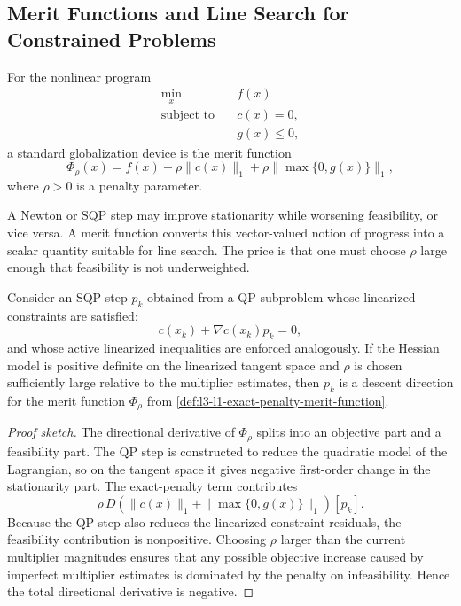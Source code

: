 \subsection{Merit Functions and Line Search for Constrained Problems}
\label{sec:l3-merit-functions-and-line-search-for-constrained-problems}

\begin{definition}\label{def:l3-l1-exact-penalty-merit-function}
	For the nonlinear program
	\begin{align*}
		\min_x \quad & f(x) \\
		\text{subject to}\quad & c(x)=0, \\
		                       & g(x)\le 0,
	\end{align*}
	a standard globalization device is the merit function
	\[
		\Phi_\rho(x)
		=
		f(x)
		+
		\rho\|c(x)\|_1
		+
		\rho\|\max\{0,g(x)\}\|_1,
	\]
	where $\rho>0$ is a penalty parameter.
\end{definition}

\begin{remark}
	A Newton or SQP step may improve stationarity while worsening feasibility, or vice versa. A merit function converts this vector-valued notion of progress into a scalar quantity suitable for line search. The price is that one must choose $\rho$ large enough that feasibility is not underweighted.
\end{remark}

\begin{proposition}\label{prop:l3-merit-decrease-for-linearized-feasible-sqp-steps}
	Consider an SQP step $p_k$ obtained from a QP subproblem whose linearized constraints are satisfied:
	\[
		c(x_k)+\nabla c(x_k)p_k=0,
	\]
	and whose active linearized inequalities are enforced analogously. If the Hessian model is positive definite on the linearized tangent space and $\rho$ is chosen sufficiently large relative to the multiplier estimates, then $p_k$ is a descent direction for the merit function $\Phi_\rho$ from \autoref{def:l3-l1-exact-penalty-merit-function}.
\end{proposition}
\begin{proof}[Proof sketch]
	The directional derivative of $\Phi_\rho$ splits into an objective part and a feasibility part. The QP step is constructed to reduce the quadratic model of the Lagrangian, so on the tangent space it gives negative first-order change in the stationarity part. The exact-penalty term contributes
	\[
		\rho \, D\!\left(\|c(x)\|_1 + \|\max\{0,g(x)\}\|_1\right)[p_k].
	\]
	Because the QP step also reduces the linearized constraint residuals, the feasibility contribution is nonpositive. Choosing $\rho$ larger than the current multiplier magnitudes ensures that any possible objective increase caused by imperfect multiplier estimates is dominated by the penalty on infeasibility. Hence the total directional derivative is negative.
\end{proof}

